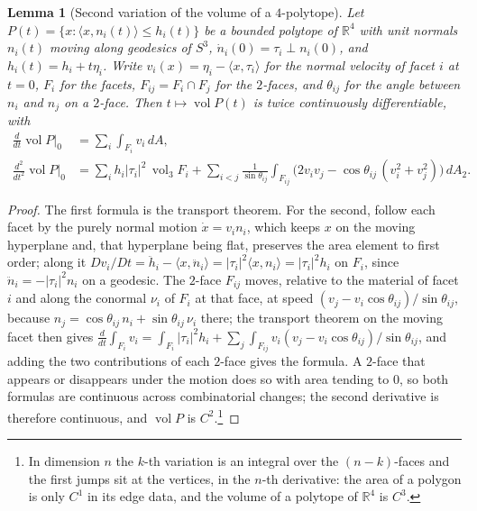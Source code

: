 \documentclass[11pt,reqno]{amsart}
\renewcommand{\_}{\origunderscore\allowbreak}
\numberwithin{equation}{section}
\theoremstyle{plain}
\newtheorem{lem}[thm]{Lemma}
\theoremstyle{definition}
\theoremstyle{remark}
\DeclareMathOperator{\vol}{vol}
\begin{document}
\begin{lem}[Second variation of the volume of a $4$-polytope]\label{lem:second-variation}
Let $P(t)=\{x:\langle x,n_i(t)\rangle\le h_i(t)\}$ be a bounded polytope of
$\mathbb R^4$ with unit normals $n_i(t)$ moving along geodesics of $S^3$,
$\dot n_i(0)=\tau_i\perp n_i(0)$, and $h_i(t)=h_i+t\eta_i$. Write
$v_i(x)=\eta_i-\langle x,\tau_i\rangle$ for the normal velocity of facet $i$
at $t=0$, $F_i$ for the facets, $F_{ij}=F_i\cap F_j$ for the $2$-faces, and
$\theta_{ij}$ for the angle between $n_i$ and $n_j$ on a $2$-face. Then
$t\mapsto\vol P(t)$ is twice continuously differentiable, with
\begin{align*}
  \frac{d}{dt}\vol P\Big|_{0}&=\sum_i\int_{F_i}v_i\,dA,\\
  \frac{d^2}{dt^2}\vol P\Big|_{0}&=\sum_i h_i|\tau_i|^2\,\vol_3F_i
  +\sum_{i<j}\frac1{\sin\theta_{ij}}\int_{F_{ij}}
  \bigl(2v_iv_j-\cos\theta_{ij}\,(v_i^2+v_j^2)\bigr)\,dA_2 .
\end{align*}
\end{lem}

\begin{proof}
The first formula is the transport theorem. For the second, follow each
facet by the purely normal motion $\dot x=v_in_i$, which keeps $x$ on the
moving hyperplane and, that hyperplane being flat, preserves the area
element to first order; along it $Dv_i/Dt=\ddot h_i-\langle x,\ddot n_i\rangle
=|\tau_i|^2\langle x,n_i\rangle=|\tau_i|^2h_i$ on $F_i$, since $\ddot n_i=-|\tau_i|^2n_i$
on a geodesic. The $2$-face $F_{ij}$ moves, relative to the material of
facet $i$ and along the conormal $\nu_i$ of $F_i$ at that face, at speed
$(v_j-v_i\cos\theta_{ij})/\sin\theta_{ij}$, because $n_j=\cos\theta_{ij}\,n_i+\sin\theta_{ij}\,\nu_i$
there; the transport theorem on the moving facet then gives
$\frac{d}{dt}\int_{F_i}v_i=\int_{F_i}|\tau_i|^2h_i+\sum_{j}\int_{F_{ij}}v_i(v_j-v_i\cos\theta_{ij})/\sin\theta_{ij}$,
and adding the two contributions of each $2$-face gives the formula. A
$2$-face that appears or disappears under the motion does so with area
tending to $0$, so both formulas are continuous across combinatorial changes;
the second derivative is therefore continuous, and $\vol P$ is $C^2$.\footnote{In
  dimension $n$ the $k$-th variation is an integral over the $(n-k)$-faces and
  the first jumps sit at the vertices, in the $n$-th derivative: the area of a
  polygon is only $C^1$ in its edge data, and the volume of a polytope of
  $\mathbb R^4$ is $C^3$.}
\end{proof}
\end{document}
